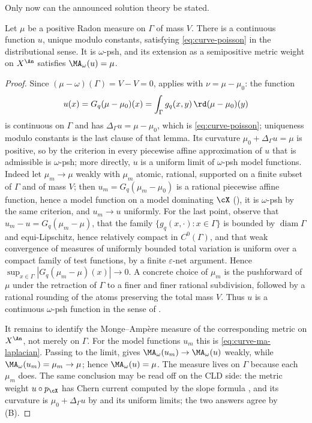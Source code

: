 Only now can the announced solution theory be stated.

\begin{proposition}
\label{prop:graph-ma-solution}
Let \(\mu\) be a positive Radon measure on \(\Gamma\) of mass \(V\).
There is a continuous function \(u\), unique modulo constants, satisfying
\eqref{eq:curve-poisson} in the distributional sense.  It is
\(\omega\)-psh, and its extension as a semipositive metric weight on
\(X^{\An}\) satisfies \(\MA_\omega(u)=\mu\).
\end{proposition}

\begin{proof}
Since \((\mu-\omega)(\Gamma)=V-V=0\),  applies
with \(\nu=\mu-\mu_0\): the function
\[
                u(x)=G_q(\mu-\mu_0)(x)
                    =\int_\Gamma g_q(x,y)\,\rd(\mu-\mu_0)(y)
\]
is continuous on \(\Gamma\) and has \(\Delta_\Gamma u=\mu-\mu_0\), which is
\eqref{eq:curve-poisson}; uniqueness modulo constants is the last clause of
that lemma.  Its curvature \(\mu_0+\Delta_\Gamma u=\mu\) is positive, so by
the criterion in  every piecewise affine
approximation of \(u\) that is admissible is \(\omega\)-psh; more directly,
\(u\) is a uniform limit of \(\omega\)-psh model functions.  Indeed let
\(\mu_m\to\mu\) weakly with \(\mu_m\) atomic, rational, supported on a
finite subset of \(\Gamma\) and of mass \(V\); then
\(u_m=G_q(\mu_m-\mu_0)\) is a rational piecewise affine function, hence a
model function on a model dominating \(\cX\)
(), it is \(\omega\)-psh by the same
criterion, and \(u_m\to u\) uniformly.  For the last point, observe that
\(u_m-u=G_q(\mu_m-\mu)\), that the family
\(\{g_q(x,\cdot):x\in\Gamma\}\) is bounded by \(\operatorname{diam}\Gamma\)
and equi-Lipschitz, hence relatively compact in \(C^0(\Gamma)\), and that
weak convergence of measures of uniformly bounded total variation is
uniform over a compact family of test functions, by a finite
\(\varepsilon\)-net argument.  Hence
\(\sup_{x\in\Gamma}|G_q(\mu_m-\mu)(x)|\to0\).  A concrete choice of
\(\mu_m\) is the pushforward of \(\mu\) under the retraction of \(\Gamma\)
to a finer and finer rational subdivision, followed by a rational rounding
of the atoms preserving the total mass \(V\).  Thus \(u\) is a
continuous \(\omega\)-psh function in the sense of
.

It remains to identify the Monge--Amp\`ere measure of the corresponding
metric on \(X^{\An}\), not merely on \(\Gamma\).  For the model functions
\(u_m\) this is \eqref{eq:curve-ma-laplacian}.  Passing to the limit,
 gives
\(\MA_\omega(u_m)\to\MA_\omega(u)\) weakly, while
\(\MA_\omega(u_m)=\mu_m\to\mu\); hence \(\MA_\omega(u)=\mu\).  The measure
lives on \(\Gamma\) because each \(\mu_m\) does.  The same conclusion may be
read off on the CLD side: the metric weight
\(u\circ p_{\cX}\) has Chern current computed by the slope formula
, and its curvature is
\(\mu_0+\Delta_\Gamma u\) by  and its
uniform limits; the two answers agree by
\,(B).
\end{proof}

